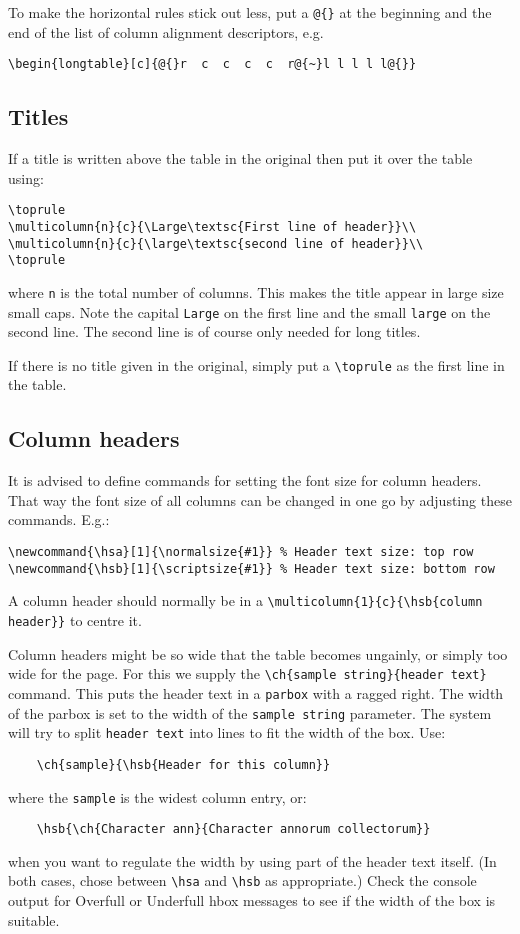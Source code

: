 \documentclass{report}
\begin{document}
To make the horizontal rules stick out less, put a \verb+@{}+ at the beginning
and the end of the list of column alignment descriptors, e.g.
\begin{verbatim}
\begin{longtable}[c]{@{}r  c  c  c  c  r@{~}l l l l l@{}}
\end{verbatim}

\subsection{Titles}
If a title is written above the table in the original then put it over the
table using:
\begin{verbatim}
\toprule
\multicolumn{n}{c}{\Large\textsc{First line of header}}\\
\multicolumn{n}{c}{\large\textsc{second line of header}}\\
\toprule
\end{verbatim}
where \verb+n+ is the total number of columns.
This makes the title appear in large size small caps.
Note the capital \verb+Large+
on the first line and the small \verb+large+ on the second line.
The second line is of course only needed for long titles.

If there is no title given in the original, simply put a \verb+\toprule+
as the first line in the table.

\subsection{Column headers}
It is advised to define commands for setting the font size for column headers.
That way the font size of all columns can be changed in one go by adjusting
these commands. E.g.:
\begin{verbatim}
\newcommand{\hsa}[1]{\normalsize{#1}} % Header text size: top row
\newcommand{\hsb}[1]{\scriptsize{#1}} % Header text size: bottom row
\end{verbatim}

A column header should normally be in a
\verb+\multicolumn{1}{c}{\hsb{column header}}+
to centre it.

Column headers might be so wide that the table becomes ungainly, or simply
too wide for the page.
For this we supply the \verb+\ch{sample string}{header text}+ command.
This puts the header text in a \verb+parbox+ with a ragged right.
The width of the parbox is set to the width of the \verb+sample string+
parameter.
The system will try to split \verb+header text+ into lines to fit
the width of the box. Use:
\begin{verbatim}
	\ch{sample}{\hsb{Header for this column}}
\end{verbatim}
where the \verb+sample+ is the widest column entry, or:
\begin{verbatim}
	\hsb{\ch{Character ann}{Character annorum collectorum}}
\end{verbatim}
when you want to regulate the width by using part of the header text itself.
(In both cases, chose between \verb+\hsa+ and \verb+\hsb+ as appropriate.)
Check the console output for Overfull or Underfull hbox messages to see
if the width of the box is suitable.
\end{document}
